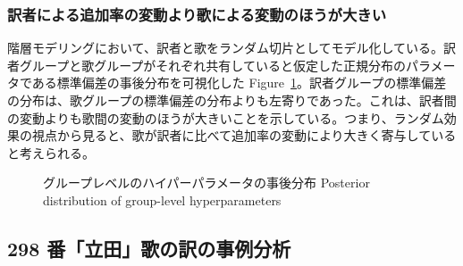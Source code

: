 \documentclass[
  letterpaper,
  DIV=11,
  numbers=noendperiod]{scrartcl}
\begin{document}
\subsubsection*{訳者による追加率の変動より歌による変動のほうが大きい}\label{ux8a33ux8005ux306bux3088ux308bux8ffdux52a0ux7387ux306eux5909ux52d5ux3088ux308aux6b4cux306bux3088ux308bux5909ux52d5ux306eux307bux3046ux304cux5927ux304dux3044}

階層モデリングにおいて、訳者と歌をランダム切片としてモデル化している。訳者グループと歌グループがそれぞれ共有していると仮定した正規分布のパラメータである標準偏差の事後分布を可視化した
Figure~\ref{fig-hyperparameter}。訳者グループの標準偏差の分布は、歌グループの標準偏差の分布よりも左寄りであった。これは、訳者間の変動よりも歌間の変動のほうが大きいことを示している。つまり、ランダム効果の視点から見ると、歌が訳者に比べて追加率の変動により大きく寄与していると考えられる。

\begin{figure}


\caption[グループレベルのハイパーパラメータの事後分布]{\label{fig-hyperparameter}グループレベルのハイパーパラメータの事後分布
Posterior distribution of group-level hyperparameters}

\end{figure}%

\subsection{298
番「立田」歌の訳の事例分析}\label{ux756aux7acbux7530ux6b4cux306eux8a33ux306eux4e8bux4f8bux5206ux6790}
\end{document}
